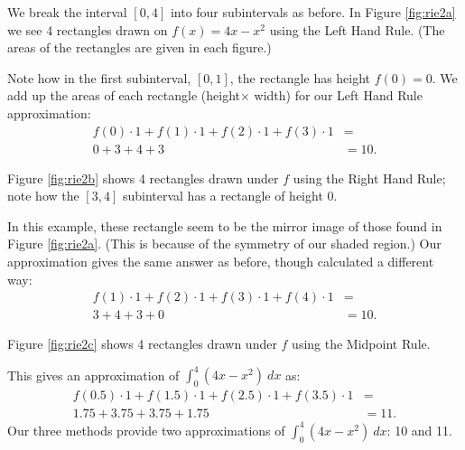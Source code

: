 {We break the interval $[0,4]$ into four subintervals as before. In Figure \ref{fig:rie2a} we see 4 rectangles drawn on $f(x) = 4x-x^2$ using the Left Hand Rule. (The areas of the rectangles are given in each figure.)


\noindent Note how in the first subinterval, $[0,1]$, the rectangle has height $f(0)=0$. We add up the areas of each rectangle (height$\times$ width) for our Left Hand Rule approximation:
	\begin{align*} f(0)\cdot 1 + f(1)\cdot 1+ f(2)\cdot 1+f(3)\cdot 1 &=\\
	0+3+4+3&= 10.
	\end{align*}
	
Figure \ref{fig:rie2b} shows 4 rectangles drawn under $f$ using the Right Hand Rule; note how the $[3,4]$ subinterval has a rectangle of height 0. 


\noindent In this example, these rectangle seem to be the mirror image of those found in Figure \ref{fig:rie2a}. (This is because of the symmetry of our shaded region.) Our approximation gives the same answer as before, though calculated a different way:
	\begin{align*} f(1)\cdot 1 + f(2)\cdot 1+ f(3)\cdot 1+f(4)\cdot 1 &=\\
	3+4+3+0&= 10.
	\end{align*}

Figure \ref{fig:rie2c} shows 4 rectangles drawn under $f$ using the Midpoint Rule.


\noindent This gives an approximation of $\int_0^4(4x-x^2)\ dx$ as:
\begin{align*} f(0.5)\cdot 1 + f(1.5)\cdot 1+ f(2.5)\cdot 1+f(3.5)\cdot 1 &=\\
	1.75+3.75+3.75+1.75&= 11.
	\end{align*}
Our three methods provide two approximations of $\int_0^4(4x-x^2)\ dx$: 10 and 11.
}\\

